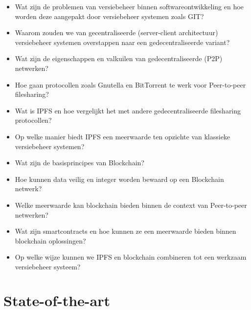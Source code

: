 \begin{itemize}
\item{Wat zijn de problemen van versiebeheer binnen softwareontwikkeling en hoe worden deze aangepakt door versiebeheer systemen zoals GIT?}
\item{Waarom zouden we van gecentraliseerde (server-client architectuur) versiebeheer systemen overstappen naar een gedecentraliseerde variant?}
\item{Wat zijn de eigenschappen en valkuilen van gedecentraliseerde (P2P) netwerken?}
\item{Hoe gaan protocollen zoals Gnutella en BitTorrent te werk voor Peer-to-peer filesharing?}
\item{Wat is IPFS en hoe vergelijkt het met andere gedecentraliseerde filesharing protocollen?}
\item{Op welke manier biedt IPFS een meerwaarde ten opzichte van klassieke versiebeheer systemen?}
\item{Wat zijn de basisprincipes van Blockchain?}
\item{Hoe kunnen data veilig en integer worden bewaard op een Blockchain netwerk?}
\item{Welke meerwaarde kan blockchain bieden binnen de context van Peer-to-peer netwerken?}
\item{Wat zijn smartcontracts en hoe kunnen ze een meerwaarde bieden binnen blockchain oplossingen? }
\item{Op welke wijze kunnen we IPFS en blockchain combineren tot een werkzaam versiebeheer systeem?}
\end{itemize}


\section{State-of-the-art}
\label{sec:state-of-the-art}


